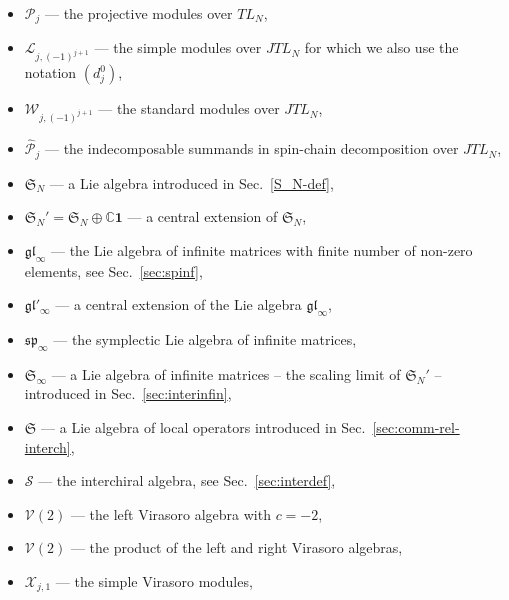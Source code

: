 \documentclass[11pt]{article}
\newcommand{\one}{\boldsymbol{1}}%
\newcommand{\TL}[1]{TL_{#1}}
\newcommand{\JTL}[1]{JTL_{#1}}
\newcommand{\oC}{\mathbb{C}}
\newcommand{\Vir}{\mathcal{V}}
\newcommand{\VirN}{\boldsymbol{\mathcal{V}}}
\newcommand{\interLie}{\mathfrak{S}}
\newcommand{\interch}{\interLie}
\newcommand{\interchalg}{\mathcal{S}}
\newcommand{\interfin}[1]{\interLie_{#1}}
\newcommand{\glinf}{\gl_{\infty}}
\newcommand{\glinfc}{\gl'_{\infty}}
\newcommand{\spinf}{\ssp_{\infty}}
\newcommand{\interinfin}{\interLie_{\infty}}
\newcommand{\gl}{\mathfrak{gl}}
\newcommand{\ssp}{\mathfrak{sp}}
\newcommand{\TLX}{d^0}
\newcommand{\VX}{\mathcal{X}}
\newcommand{\PrTL}[1]{\mathscr{P}_{#1}}
\newcommand{\AIrrTL}[2]{\mathscr{L}_{#1,#2}}
\newcommand{\APrTL}[1]{\widehat{\mathscr{P}}_{#1}}
\newcommand{\AStTL}[2]{\mathscr{W}_{#1,#2}}
\theoremstyle{definition}
\begin{document}
\begin{itemize}
\item[\mbox{}]$\PrTL{j}$ --- the projective modules over $\TL{N}$,

\item[\mbox{}]$\AIrrTL{j}{(-1)^{j+1}}$ --- the simple modules over $\JTL{N}$
  for which we also use the notation $(\TLX_{j})$,

\item[\mbox{}]$\AStTL{j}{(-1)^{j+1}}$ --- the standard modules over $\JTL{N}$,

\item[\mbox{}]$\APrTL{j}$ --- the indecomposable summands in spin-chain decomposition over $\JTL{N}$,

\item[\mbox{}]$\interfin{N}$ --- a Lie algebra introduced in Sec.~\ref{S_N-def},

\item[\mbox{}]$\interfin{N}'=\interfin{N}\oplus\oC\one$ --- a central extension of $\interfin{N}$,

\item[\mbox{}]$\glinf$ ---  the Lie algebra  of infinite matrices with finite number of non-zero elements, see Sec.~\ref{sec:spinf},

\item[\mbox{}]$\glinfc$ --- a central extension of the Lie algebra $\glinf$,

\item[\mbox{}]$\spinf$ --- the symplectic Lie algebra of infinite matrices,


\item[\mbox{}]$\interinfin$ --- a Lie algebra of infinite matrices -- the scaling limit of $\interfin{N}'$ -- introduced in Sec.~\ref{sec:interinfin},

\item[\mbox{}]$\interch$ --- a Lie algebra of local operators introduced in Sec.~\ref{sec:comm-rel-interch},


\item[\mbox{}]$\interchalg$ --- the interchiral algebra, see Sec.~\ref{sec:interdef},


\item[\mbox{}]$\Vir(2)$ --- the left Virasoro algebra with $c=-2$,



\item[\mbox{}]$\VirN(2)$ --- the product of the left and right Virasoro algebras,

\item[\mbox{}]$\VX_{j,1}$ --- the simple Virasoro modules,


\end{itemize}
\end{document}
